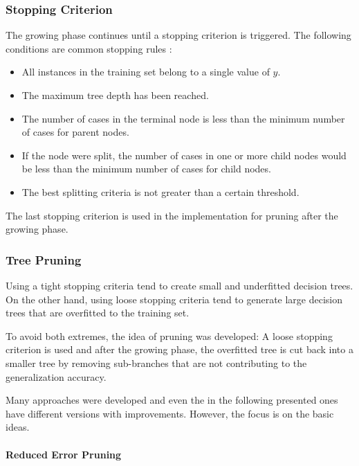 \subsubsection{Stopping Criterion}

The growing phase continues until a stopping criterion is triggered. The following conditions are common stopping rules \cite[p. 63]{rokach2008data}:
\begin{itemize}
    \item All instances in the training set belong to a single value of $y$.
    \item The maximum tree depth has been reached.
    \item The number of cases in the terminal node is less than the minimum
number of cases for parent nodes.
    \item If the node were split, the number of cases in one or more child nodes
would be less than the minimum number of cases for child nodes.
    \item The best splitting criteria is not greater than a certain threshold.
\end{itemize}


\begin{remark}
    The last stopping criterion is used in the implementation for pruning after the growing phase.\label{stoppingcriterionimpl}
\end{remark}



\subsubsection{Tree Pruning}\label{treepruning}

Using a tight stopping criteria tend to create small and underfitted decision trees. On the other hand, using  loose stopping criteria tend to generate large decision trees that are overfitted to the training set. 

To avoid both extremes, the idea of pruning was developed: A loose stopping criterion is used and after the growing phase, the overfitted tree is cut back into a smaller tree by removing sub-branches that are not contributing to the generalization accuracy. 

Many approaches were developed and even the in the following presented ones have different versions with improvements. However, the focus is on the basic ideas. 


\paragraph{Reduced Error Pruning}

